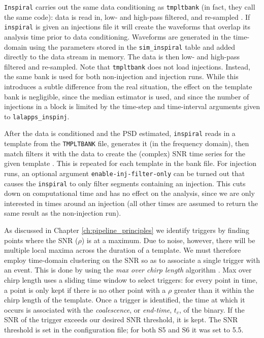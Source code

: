 \texttt{Inspiral} carries out the same data conditioning as \texttt{tmpltbank}
(in fact, they call the same code): data is read in, low- and high-pass
filtered, and re-sampled \cite{brown-2005-22, Allen:2005fk}. If
\texttt{inspiral} is given an injections file it will create the waveforms that
overlap its analysis time prior to data conditioning. Waveforms are generated
in the time-domain using the parameters stored in the \texttt{sim\_inspiral}
table and added directly to the data stream in memory. The data is then low-
and high-pass filtered and re-sampled. Note that \texttt{tmpltbank} does not
load injections. Instead, the same bank is used for both non-injection and
injection runs. While this introduces a subtle difference from the real
situation, the effect on the template bank is negligible, since the median
estimator is used, and since the number of injections in a block is limited by
the time-step and time-interval arguments given to \texttt{lalapps\_inspinj}.

After the data is conditioned and the \ac{PSD} estimated, \texttt{inspiral}
reads in a template from the \texttt{TMPLTBANK} file, generates it (in the
frequency domain), then match filters it with the data to create the (complex)
\ac{SNR} time series for the given template \cite{brown-2005-22, Allen:2005fk}.
This is repeated for each template in the bank file. For injection runs, an
optional argument \texttt{enable-inj-filter-only} can be turned out that causes
the \texttt{inspiral} to only filter segments containing an injection. This
cuts down on computational time and has no effect on the analysis, since we are
only interested in times around an injection (all other times are assumed to
return the same result as the non-injection run).

As discussed in Chapter \ref{ch:pipeline_principles} we identify triggers by
finding points where the \ac{SNR} ($\rho$) is at a maximum. Due to noise,
however, there will be multiple local maxima across the duration of a template.
We must therefore employ time-domain clustering on the \ac{SNR} so as to
associate a single trigger with an event. This is done by using the \emph{max
over chirp length} algorithm \cite{Brown}. Max over chirp length uses a sliding
time window to select triggers: for every point in time, a point is only kept
if there is no other point with a $\rho$ greater than it within the chirp
length of the template. Once a trigger is identified, the time at which it
occurs is associated with the \emph{coalescence}, or \emph{end-time}, $t_c$, of
the binary. If the \ac{SNR} of the trigger exceeds our desired \ac{SNR}
threshold, it is kept. The \ac{SNR} threshold is set in the configuration file;
for both \ac{S5} and \ac{S6} it was set to 5.5.

